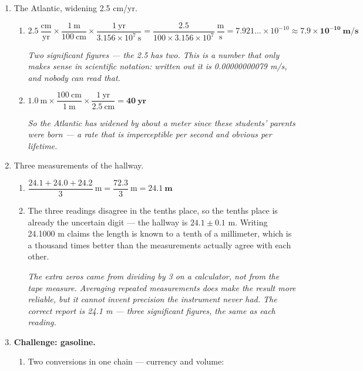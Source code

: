 \documentclass[12pt, twoside]{article}
\begin{document}
\begin{enumerate}[itemsep=0.25cm]
\item The Atlantic, widening 2.5 cm/yr.
  \begin{enumerate}[itemsep=0.15cm]
    \item $2.5~\dfrac{\text{cm}}{\text{yr}} \times \dfrac{1~\text{m}}{100~\text{cm}}
      \times \dfrac{1~\text{yr}}{3.156 \times 10^{7}~\text{s}}
      = \dfrac{2.5}{100 \times 3.156 \times 10^{7}}~\dfrac{\text{m}}{\text{s}}
      = 7.921\ldots \times 10^{-10} \approx \mathbf{7.9 \times 10^{-10}~\textbf{m/s}}$

      \emph{Two significant figures --- the 2.5 has two. This is a number that only makes
      sense in scientific notation: written out it is 0.00000000079 m/s, and nobody can
      read that.}
    \item $1.0~\text{m} \times \dfrac{100~\text{cm}}{1~\text{m}}
      \times \dfrac{1~\text{yr}}{2.5~\text{cm}} = \mathbf{40~\textbf{yr}}$

      \emph{So the Atlantic has widened by about a meter since these students' parents
      were born --- a rate that is imperceptible per second and obvious per lifetime.}
  \end{enumerate}

\item Three measurements of the hallway.
  \begin{enumerate}[itemsep=0.15cm]
    \item $\dfrac{24.1 + 24.0 + 24.2}{3}~\text{m} = \dfrac{72.3}{3}~\text{m}
      = \mathbf{24.1~\textbf{m}}$
    \item The three readings disagree in the tenths place, so the tenths place is already
      the uncertain digit --- the hallway is $24.1 \pm 0.1$ m. Writing 24.1000 m claims the
      length is known to a tenth of a millimeter, which is a thousand times better than the
      measurements actually agree with each other.

      \emph{The extra zeros came from dividing by 3 on a calculator, not from the tape
      measure. Averaging repeated measurements does make the result more reliable, but it
      cannot invent precision the instrument never had. The correct report is 24.1 m ---
      three significant figures, the same as each reading.}
  \end{enumerate}

\item \textbf{Challenge: gasoline.}
  \begin{enumerate}[itemsep=0.15cm]
    \item Two conversions in one chain --- currency and volume:


\end{enumerate}
\end{enumerate}
\end{document}
